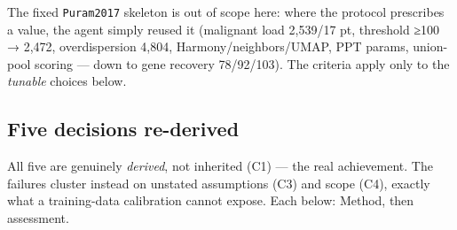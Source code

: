 \documentclass[11pt,a4paper]{article}
\begin{document}
The fixed \texttt{Puram2017} skeleton is out of scope here: where the
protocol prescribes a value, the agent simply reused it (malignant load
2,539/17 pt, threshold ≥100 → 2,472, overdispersion 4,804,
Harmony/neighbors/UMAP, PPT params, union-pool scoring --- down to gene
recovery 78/92/103). The criteria apply only to the \emph{tunable}
choices below.

\hypertarget{five-decisions-re-derived}{%
\subsection{Five decisions re-derived}\label{five-decisions-re-derived}}

All five are genuinely \emph{derived}, not inherited (C1) --- the real
achievement. The failures cluster instead on unstated assumptions (C3)
and scope (C4), exactly what a training-data calibration cannot expose.
Each below: Method, then assessment.
\end{document}

